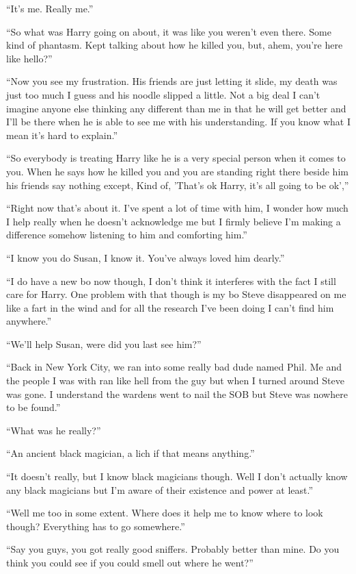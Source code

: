 ``It's me. Really me.''

``So what was Harry going on about, it was like you weren't even there. Some kind of phantasm. Kept talking about how he killed you, but, ahem, you're here like hello?''

``Now you see my frustration. His friends are just letting it slide, my death was just too much I guess and his noodle slipped a little. Not a big deal I can't imagine anyone else thinking any different than me in that he will get better and I'll be there when he is able to see me with his understanding. If you know what I mean it's hard to explain.''

``So everybody is treating Harry like he is a very special person when it comes to you. When he says how he killed you and you are standing right there beside him his friends say nothing except, Kind of, 'That's ok Harry, it's all going to be ok',''

``Right now that's about it. I've spent a lot of time with him, I wonder how much I help really when he doesn't acknowledge me but I firmly believe I'm making a difference somehow listening to him and comforting him.''

``I know you do Susan, I know it. You've always loved him dearly.''

``I do have a new bo now though, I don't think it interferes with the fact I still care for Harry. One problem with that though is my bo Steve disappeared on me like a fart in the wind and for all the research I've been doing I can't find him anywhere.''

``We'll help Susan, were did you last see him?''

``Back in New York City, we ran into some really bad dude named Phil. Me and the people I was with ran like hell from the guy but when I turned around Steve was gone. I understand the wardens went to nail the SOB but Steve was nowhere to be found.''

``What was he really?''

``An ancient black magician, a lich if that means anything.''

``It doesn't really, but I know black magicians though. Well I don't actually know any black magicians but I'm aware of their existence and power at least.''

``Well me too in some extent. Where does it help me to know where to look though? Everything has to go somewhere.''

``Say you guys, you got really good sniffers. Probably better than mine. Do you think you could see if you could smell out where he went?''

